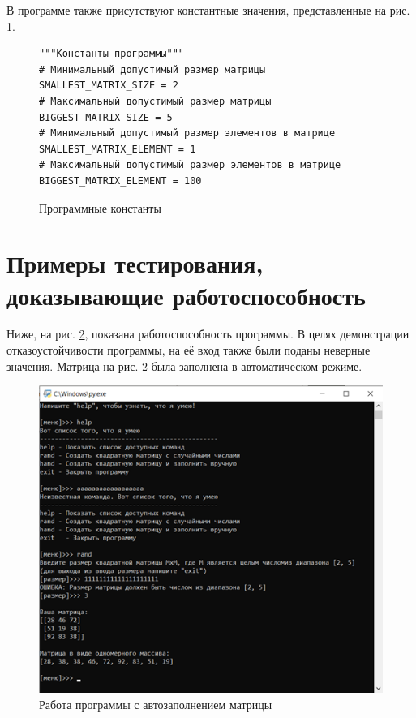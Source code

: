 \documentclass{mirea}
\begin{document}
В программе также присутствуют константные значения, представленные на рис. \ref{func:constants}.
\begin{figure}[ht]
	\begin{verbatim}
"""Константы программы"""
# Минимальный допустимый размер матрицы
SMALLEST_MATRIX_SIZE = 2
# Максимальный допустимый размер матрицы
BIGGEST_MATRIX_SIZE = 5
# Минимальный допустимый размер элементов в матрице
SMALLEST_MATRIX_ELEMENT = 1
# Максимальный допустимый размер элементов в матрице
BIGGEST_MATRIX_ELEMENT = 100
	\end{verbatim}
	\caption{Программные константы}
	\label{func:constants}
\end{figure}


\section{Примеры тестирования, доказывающие работоспособность}

Ниже, на рис. \ref{func:test auto}, показана работоспособность программы. В целях демонстрации отказоустойчивости программы, на её вход также были поданы неверные значения. Матрица на рис. \ref{func:test auto} была заполнена в автоматическом режиме.
\begin{figure}[ht]
	\centering
	\includegraphics{Test rand.png}
	\caption{Работа программы с автозаполнением матрицы}
	\label{func:test auto}
\end{figure}
\end{document}
